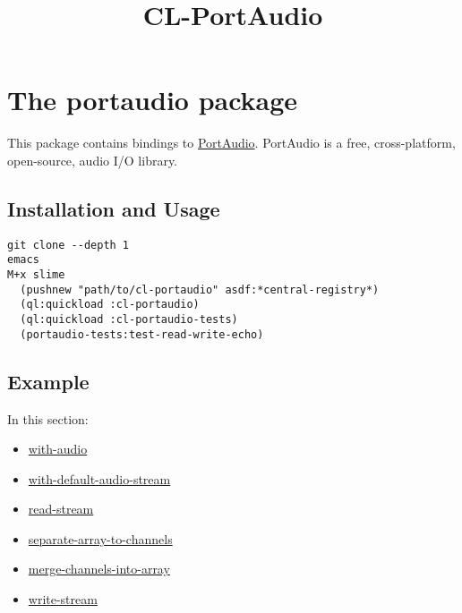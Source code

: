 \documentclass[a4paper]{report}
\begin{document}
    

    \title{CL-PortAudio}
    \maketitle

    \tableofcontents
    \newpage

    
    \chapter{The portaudio package}
    This package contains bindings to \href{http://portaudio.com/}{PortAudio}. PortAudio is a free, cross-platform, open-source, audio I/O library.

\section{Installation and Usage} \label{d0d0e0e0e0e0}\begin{verbatim}
git clone --depth 1 
emacs
M+x slime
  (pushnew "path/to/cl-portaudio" asdf:*central-registry*)
  (ql:quickload :cl-portaudio)
  (ql:quickload :cl-portaudio-tests)
  (portaudio-tests:test-read-write-echo)\end{verbatim}\section{Example} \label{d0d0e0e0e0e1}
      In this section:
      \begin{itemize}
      
	\item
	\hyperref[portaudio__fun__with-audio]{with-audio}
	    
	\item
	\hyperref[portaudio__fun__with-default-audio-stream]{with-default-audio-stream}
	    
	\item
	\hyperref[portaudio__fun__read-stream]{read-stream}
	    
	\item
	\hyperref[portaudio__fun__separate-array-to-channels]{separate-array-to-channels}
	    
	\item
	\hyperref[portaudio__fun__merge-channels-into-array]{merge-channels-into-array}
	    
	\item
	\hyperref[portaudio__fun__write-stream]{write-stream}
	    
      \end{itemize}
\end{document}
